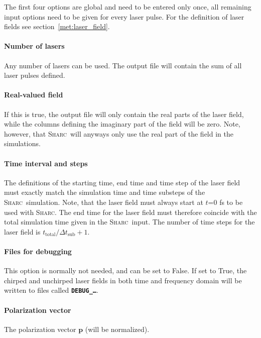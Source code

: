 \documentclass[a4paper,10pt,DIV=15,openany,twoside=false]{scrbook}
\newcommand{\sharc}{\textsc{Sharc}}
\newcommand{\ttt}[1]{\textbf{\texttt{#1}}}
\newcommand{\VEC}[1]{\ensuremath{\mathbf{#1}}}
\begin{document}
The first four options are global and need to be entered only once, all remaining input options need to be given for every laser pulse. For the definition of laser fields see section~\ref{met:laser_field}.

\paragraph{Number of lasers}

Any number of lasers can be used. The output file will contain the sum of all laser pulses defined.

\paragraph{Real-valued field}

If this is true, the output file will only contain the real parts of the laser field, while the columns defining the imaginary part of the field will be zero. Note, however, that \sharc\ will anyways only use the real part of the field in the simulations.

\paragraph{Time interval and steps}

The definitions of the starting time, end time and time step of the laser field must exactly match the simulation time and time substeps of the \sharc\ simulation. Note, that the laser field must always start at $t$=0 fs to be used with \sharc. The end time for the laser field must therefore coincide with the total simulation time given in the \sharc\ input. The number of time steps for the laser field is $t_\text{total}/\Delta t_\text{sub} +1$.

\paragraph{Files for debugging}

This option is normally not needed, and can be set to False. If set to True, the chirped and unchirped laser fields in both time and frequency domain will be written to files called \ttt{DEBUG\_\dots}.

\paragraph{Polarization vector}

The polarization vector $\VEC{p}$ (will be normalized).
\end{document}
